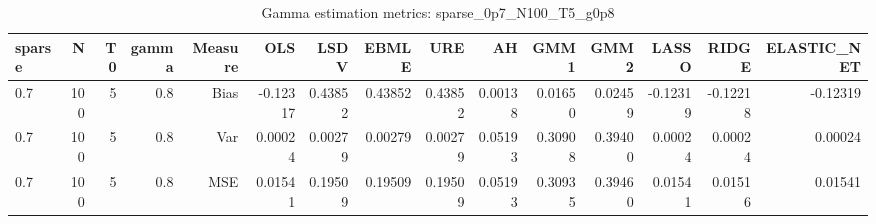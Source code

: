 \begin{table}[!htbp]\centering
\caption{Gamma estimation metrics: sparse_0p7_N100_T5_g0p8}
\label{tab:table1_sparse_0p7_N100_T5_g0p8}
\begin{tabular}{lrrrrrrrrrrrrrr}
\hline
sparse & N & T0 & gamma & Measure & OLS & LSDV & EBMLE & URE & AH & GMM1 & GMM2 & LASSO & RIDGE & ELASTIC_NET \\
\hline
0.7 & 100 & 5 & 0.8 & Bias & -0.12317 & 0.43852 & 0.43852 & 0.43852 & 0.00138 & 0.01650 & 0.02459 & -0.12319 & -0.12218 & -0.12319 \\
0.7 & 100 & 5 & 0.8 & Var & 0.00024 & 0.00279 & 0.00279 & 0.00279 & 0.05193 & 0.30908 & 0.39400 & 0.00024 & 0.00024 & 0.00024 \\
0.7 & 100 & 5 & 0.8 & MSE & 0.01541 & 0.19509 & 0.19509 & 0.19509 & 0.05193 & 0.30935 & 0.39460 & 0.01541 & 0.01516 & 0.01541 \\
\hline
\end{tabular}
\end{table}

